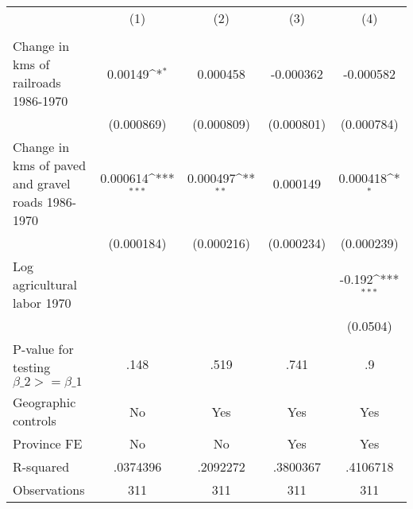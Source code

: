 {
\def\sym#1{\ifmmode^{#1}\else\(^{#1}\)\fi}
\begin{tabular}{l*{4}{c}}
\hline\hline
                &\multicolumn{1}{c}{(1)}&\multicolumn{1}{c}{(2)}&\multicolumn{1}{c}{(3)}&\multicolumn{1}{c}{(4)}\\
                &\multicolumn{1}{c}{}&\multicolumn{1}{c}{}&\multicolumn{1}{c}{}&\multicolumn{1}{c}{}\\
\hline
Change in kms of railroads 1986-1970&  0.00149\sym{*}  & 0.000458         &-0.000362         &-0.000582         \\
                &(0.000869)         &(0.000809)         &(0.000801)         &(0.000784)         \\
[1em]
Change in kms of paved and gravel roads 1986-1970& 0.000614\sym{***}& 0.000497\sym{**} & 0.000149         & 0.000418\sym{*}  \\
                &(0.000184)         &(0.000216)         &(0.000234)         &(0.000239)         \\
[1em]
Log agricultural labor 1970&                  &                  &                  &   -0.192\sym{***}\\
                &                  &                  &                  & (0.0504)         \\
\hline
P-value for testing $\beta\_{2} >= \beta\_{1}$&     .148         &     .519         &     .741         &       .9         \\
Geographic controls&       No         &      Yes         &      Yes         &      Yes         \\
Province FE     &       No         &       No         &      Yes         &      Yes         \\
R-squared       & .0374396         & .2092272         & .3800367         & .4106718         \\
Observations    &      311         &      311         &      311         &      311         \\
\hline\hline
\end{tabular}
}
